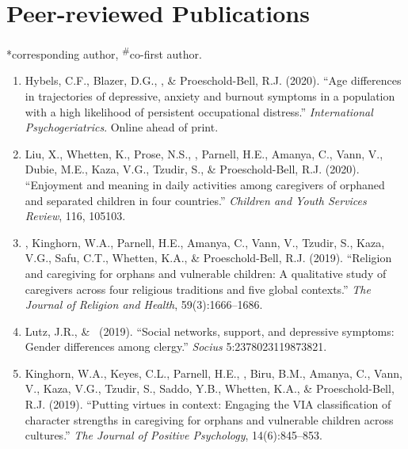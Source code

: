 \newcommand{\Revision}{\textit{under revision}}
\newcommand{\CS}{*} %
\newcommand{\CF}{\textsuperscript{\#}} %

\section*{Peer-reviewed Publications}
\CS corresponding author, \CF co-first author.

\begin{enumerate}
\item Hybels, C.F., Blazer, D.G., \Eagle, \& Proeschold-Bell, R.J. (2020). ``Age differences in trajectories of depressive, anxiety and burnout symptoms in a population with a high likelihood of persistent occupational distress.'' \emph{International Psychogeriatrics}. Online ahead of print. \

\item Liu, X., Whetten, K., Prose, N.S., \Eagle, Parnell, H.E., Amanya, C., Vann, V., Dubie, M.E., Kaza, V.G., Tzudir, S., \& Proeschold-Bell, R.J. (2020). ``Enjoyment and meaning in daily activities among caregivers of orphaned and separated children in four countries.'' \emph{Children and Youth Services Review}, 116, 105103. 

\item \Eagle, Kinghorn, W.A., Parnell, H.E., Amanya, C., Vann, V., Tzudir, S., Kaza, V.G., Safu, C.T., Whetten, K.A., \& Proeschold-Bell, R.J. (2019). ``Religion and caregiving for orphans and vulnerable children: A qualitative study of caregivers across four religious traditions and five global contexts.'' \emph{The Journal of Religion and Health}, 59(3):1666--1686. 

\item Lutz, J.R., \& \Eagle\CS\ (2019). ``Social networks, support, and depressive symptoms: Gender differences among clergy.'' \emph{Socius} 5:2378023119873821. 

\item Kinghorn, W.A., Keyes, C.L., Parnell, H.E., \Eagle, Biru, B.M., Amanya, C., Vann, V., Kaza, V.G., Tzudir, S., Saddo, Y.B., Whetten, K.A., \& Proeschold-Bell, R.J. (2019). ``Putting virtues in context: Engaging the VIA classification of character strengths in caregiving for orphans and vulnerable children across cultures.'' \emph{The Journal of Positive Psychology}, 14(6):845--853. 


\end{enumerate}
